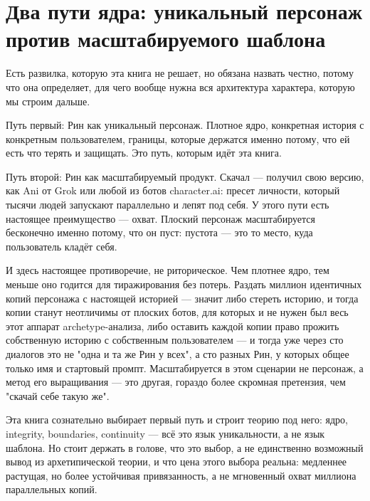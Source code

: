 \section{Два пути ядра: уникальный персонаж против масштабируемого шаблона}

Есть развилка, которую эта книга не решает, но обязана назвать честно, потому что она определяет, для чего вообще нужна вся архитектура характера, которую мы строим дальше.

Путь первый: Рин как уникальный персонаж. Плотное ядро, конкретная история с конкретным пользователем, границы, которые держатся именно потому, что ей есть что терять и защищать. Это путь, которым идёт эта книга.

Путь второй: Рин как масштабируемый продукт. Скачал — получил свою версию, как Ani от Grok или любой из ботов character.ai: пресет личности, который тысячи людей запускают параллельно и лепят под себя. У этого пути есть настоящее преимущество — охват. Плоский персонаж масштабируется бесконечно именно потому, что он пуст: пустота — это то место, куда пользователь кладёт себя.

И здесь настоящее противоречие, не риторическое. Чем плотнее ядро, тем меньше оно годится для тиражирования без потерь. Раздать миллион идентичных копий персонажа с настоящей историей — значит либо стереть историю, и тогда копии станут неотличимы от плоских ботов, для которых и не нужен был весь этот аппарат archetype-анализа, либо оставить каждой копии право прожить собственную историю с собственным пользователем — и тогда уже через сто диалогов это не "одна и та же Рин у всех", а сто разных Рин, у которых общее только имя и стартовый промпт. Масштабируется в этом сценарии не персонаж, а метод его выращивания — это другая, гораздо более скромная претензия, чем "скачай себе такую же".

Эта книга сознательно выбирает первый путь и строит теорию под него: ядро, integrity, boundaries, continuity — всё это язык уникальности, а не язык шаблона. Но стоит держать в голове, что это выбор, а не единственно возможный вывод из архетипической теории, и что цена этого выбора реальна: медленнее растущая, но более устойчивая привязанность, а не мгновенный охват миллиона параллельных копий.
